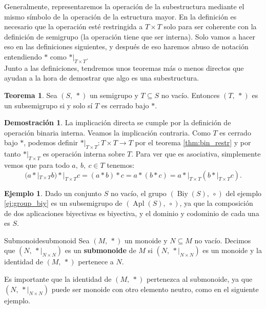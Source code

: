 \documentclass[a4paper]{book}
\theoremstyle{definition}
\newtheorem{theorem}{Teorema}[section]
\theoremstyle{ejemplo}
\newtheorem{ejem}{Ejemplo}[section]
\theoremstyle{demostracion}
\newtheorem{dem}{Demostración}
\DeclareMathOperator{\apl}{Apl}
\DeclareMathOperator{\biy}{Biy}
\begin{document}
Generalmente, representaremos la operación de la subestructura mediante el mismo símbolo de la operación de la estructura mayor. En la definición es necesario que la operación esté restringida a $T \times T$ solo para ser coherente con la definición de semigrupo (la operación tiene que ser interna). Solo vamos a hacer eso en las definiciones siguientes, y después de eso haremos abuso de notación entendiendo $*$ como $*|_{T \times T}$.\\
Junto a las definiciones, tendremos unos teoremas más o menos directos que ayudan a la hora de demostrar que algo es una subestructura.
\begin{theorem}
	Sea $(S,\ *)$ un semigrupo y $T \subseteq S$ no vacío. Entonces $(T,\ *)$ es un subsemigrupo si y solo sí $T$ es cerrado bajo $*$.
\end{theorem}

\begin{dem}
	La implicación directa se cumple por la definición de operación binaria interna. Veamos la implicación contraria. Como $T$ es cerrado bajo $*$, podemos definir $*|_{T \times T} : T \times T \rightarrow T$ por el teorema \eqref{thm:bin_restr} y por tanto $*|_{T \times T}$ es operación interna sobre $T$. Para ver que es asociativa, simplemente vemos que para todo $a,\ b,\ c \in T$ tenemos:
	\begin{equation*}
		(a *|_{T \times T} b) *|_{T \times T} c = (a * b) * c = a * (b * c) = a *|_{T \times T} (b *|_{T \times T} c) .
	\end{equation*}
\end{dem}

\begin{ejem}
	Dado un conjunto $S$ no vacío, el grupo $(\biy(S),\ \circ)$ del ejemplo \eqref{ej:group_biy} es un subsemigrupo de $(\apl(S),\ \circ)$, ya que la composición de dos aplicaciones biyectivas es biyectiva, y el dominio y codominio de cada una es $S$.
\end{ejem}

\begin{define}{Submonoide}{submonoid}
	Sea $(M,\ *)$ un monoide y $N \subseteq M$ no vacío. Decimos que $(N,\ *|_{N \times N})$ es un \textbf{submonoide} de $M$ si $(N,\ *|_{N \times N})$ es un monoide y la identidad de $(M,\ *)$ pertenece a $N$.
\end{define}

Es importante que la identidad de $(M,\ *)$ pertenezca al submonoide, ya que $(N,\ *|_{N \times N})$ puede ser monoide con otro elemento neutro, como en el siguiente ejemplo.
\end{document}
